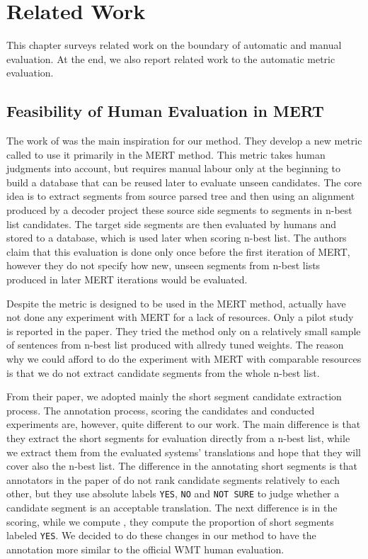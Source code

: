 \chapter{Related Work}
\label{chapter:related}

This chapter surveys related work on the boundary of automatic and manual
evaluation. At the end, we also report related work to the automatic metric
evaluation.

\section{Feasibility of Human Evaluation in MERT}

The work of  was the main inspiration for our
 method. They develop a new metric called  to use
it primarily in the MERT method. This metric takes human judgments into
account, but requires manual labour only at the beginning to build a database
that can be reused later to evaluate unseen candidates. The core idea is to
extract segments from source parsed tree and then using an alignment produced
by a decoder project these source side segments to segments in n-best list
candidates.  The target side segments are then evaluated by humans and stored
to a database, which is used later when scoring n-best list. The authors claim
that this evaluation is done only once before the first iteration of MERT,
however they do not specify how new, unseen segments from n-best lists produced
in later MERT iterations would be evaluated.

Despite the  metric is designed to be used in the MERT method,
 actually have not done any experiment with MERT
for a lack of resources. Only a pilot study is reported in the paper. They
tried the method only on a relatively small sample of sentences from n-best
list produced with allredy tuned weights. The reason why we could afford to do
the experiment with MERT with comparable resources is that we do not extract
candidate segments from the whole n-best list.

From their paper, we adopted mainly the short segment candidate extraction
process. The annotation process, scoring the candidates and conducted
experiments are, however, quite different to our work. The main difference is
that they extract the short segments for evaluation directly from a n-best
list, while we extract them from the evaluated systems' translations and hope
that they will cover also the n-best list. The difference in the annotating
short segments is that annotators in the paper of 
do not rank candidate segments relatively to each other, but they use absolute
labels \texttt{YES}, \texttt{NO} and \texttt{NOT SURE} to judge whether a
candidate segment is an acceptable translation. The next difference is in the
scoring, while we compute , they compute
the proportion of short segments labeled \texttt{YES}.  We decided to do these
changes in our method to have the annotation more similar to the official WMT
human evaluation.

